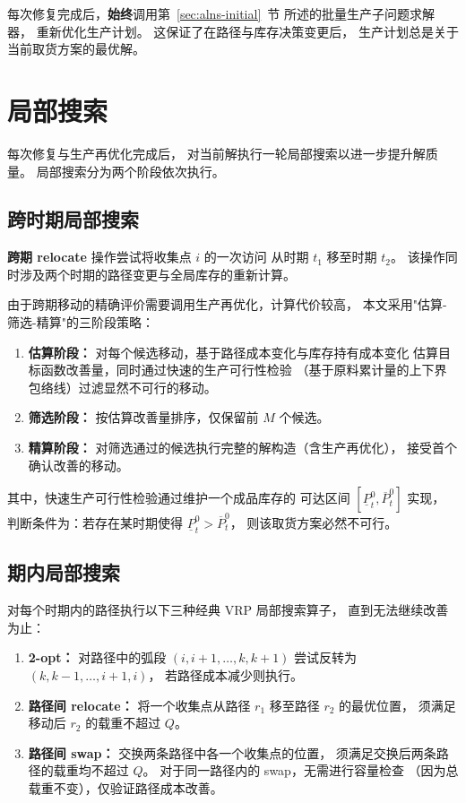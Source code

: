 \documentclass{article}
\begin{document}
每次修复完成后，\textbf{始终}调用第~\ref{sec:alns-initial}~节
所述的批量生产子问题求解器，
重新优化生产计划。
这保证了在路径与库存决策变更后，
生产计划总是关于当前取货方案的最优解。

\section{局部搜索}
\label{sec:alns-local-search}

每次修复与生产再优化完成后，
对当前解执行一轮局部搜索以进一步提升解质量。
局部搜索分为两个阶段依次执行。

\subsection{跨时期局部搜索}

\textbf{跨期 relocate} 操作尝试将收集点 $i$ 的一次访问
从时期 $t_1$ 移至时期 $t_2$。
该操作同时涉及两个时期的路径变更与全局库存的重新计算。

由于跨期移动的精确评价需要调用生产再优化，计算代价较高，
本文采用"估算-筛选-精算"的三阶段策略：

\begin{enumerate}
  \item \textbf{估算阶段：}
    对每个候选移动，基于路径成本变化与库存持有成本变化
    估算目标函数改善量，同时通过快速的生产可行性检验
    （基于原料累计量的上下界包络线）过滤显然不可行的移动。
  \item \textbf{筛选阶段：}
    按估算改善量排序，仅保留前 $M$ 个候选。
  \item \textbf{精算阶段：}
    对筛选通过的候选执行完整的解构造（含生产再优化），
    接受首个确认改善的移动。
\end{enumerate}

其中，快速生产可行性检验通过维护一个成品库存的
可达区间 $[\underline{P}^0_t, \overline{P}^0_t]$ 实现，
判断条件为：若存在某时期使得 $\underline{P}^0_t > \overline{P}^0_t$，
则该取货方案必然不可行。

\subsection{期内局部搜索}

对每个时期内的路径执行以下三种经典 VRP 局部搜索算子，
直到无法继续改善为止：

\begin{enumerate}
  \item \textbf{2-opt：}
    对路径中的弧段 $(i, i{+}1, \dots, k, k{+}1)$
    尝试反转为 $(k, k{-}1, \dots, i{+}1, i)$，
    若路径成本减少则执行。

  \item \textbf{路径间 relocate：}
    将一个收集点从路径 $r_1$ 移至路径 $r_2$ 的最优位置，
    须满足移动后 $r_2$ 的载重不超过 $Q$。

  \item \textbf{路径间 swap：}
    交换两条路径中各一个收集点的位置，
    须满足交换后两条路径的载重均不超过 $Q$。
    对于同一路径内的 swap，无需进行容量检查
    （因为总载重不变），仅验证路径成本改善。
\end{enumerate}
\end{document}
